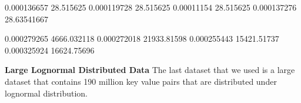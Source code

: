 	
0.000136657	28.515625
0.000119728	28.515625
0.00011154	28.515625
0.000137276	28.63541667
	
0.000279265	4666.032118
0.000272018	21933.81598
0.000255443	15421.51737
0.000325924	16624.75696

\textbf{Large Lognormal Distributed Data} The last dataset that we used is a large dataset that contains 190 million key value pairs that are distributed under lognormal distribution.